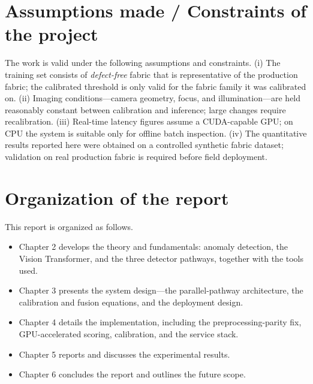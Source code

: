 \section[Assumptions made / Constraints of the project]{\textbf{Assumptions made / Constraints of the project}}

The work is valid under the following assumptions and constraints. (i) The training set consists of \emph{defect-free} fabric that is representative of the production fabric; the calibrated threshold is only valid for the fabric family it was calibrated on. (ii) Imaging conditions---camera geometry, focus, and illumination---are held reasonably constant between calibration and inference; large changes require recalibration. (iii) Real-time latency figures assume a CUDA-capable GPU; on CPU the system is suitable only for offline batch inspection. (iv) The quantitative results reported here were obtained on a controlled synthetic fabric dataset; validation on real production fabric is required before field deployment.

\section[Organization of the report]{\textbf{Organization of the report}}

This report is organized as follows.
\begin{itemize}
\item Chapter 2 develops the theory and fundamentals: anomaly detection, the Vision Transformer, and the three detector pathways, together with the tools used.
\item Chapter 3 presents the system design---the parallel-pathway architecture, the calibration and fusion equations, and the deployment design.
\item Chapter 4 details the implementation, including the preprocessing-parity fix, GPU-accelerated scoring, calibration, and the service stack.
\item Chapter 5 reports and discusses the experimental results.
\item Chapter 6 concludes the report and outlines the future scope.
\end{itemize}
